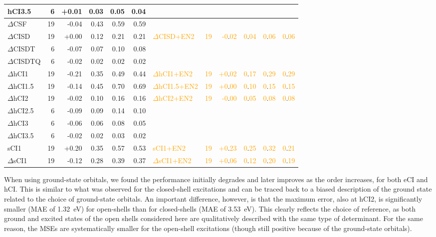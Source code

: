 \documentclass[aip,jcp,reprint,noshowkeys,superscriptaddress]{revtex4-1}
\newcommand{\fk}[1]{\textcolor{orange}{#1}}
\begin{document}
\begin{table}[ht!]
\begin{ruledtabular}
\begin{tabular}{ldddddlddddd}
hCI3.5            &  6 & +0.01 & 0.03 & 0.05 & 0.04  & & & & & & \\
%
\hline
$\Delta$CSF       & 19 & -0.04 & 0.43 & 0.59 & 0.59  & & & & & & \\
$\Delta$CISD      & 19 & +0.00 & 0.12 & 0.21 & 0.21  & \fk{$\Delta$CISD+EN2}   & \fk{19} & \fk{-0}.\fk{02} & \fk{0}.\fk{04} & \fk{0}.\fk{06} & \fk{0}.\fk{06} \\
$\Delta$CISDT     &  6 & -0.07 & 0.07 & 0.10 & 0.08  & & & & & & \\
$\Delta$CISDTQ    &  6 & -0.02 & 0.02 & 0.02 & 0.02  & & & & & & \\
%
\hline
$\Delta$hCI1      & 19 & -0.21 & 0.35 & 0.49 & 0.44  & \fk{$\Delta$hCI1+EN2}   & \fk{19} & \fk{+0}.\fk{02} & \fk{0}.\fk{17} & \fk{0}.\fk{29} & \fk{0}.\fk{29} \\
$\Delta$hCI1.5    & 19 & -0.14 & 0.45 & 0.70 & 0.69  & \fk{$\Delta$hCI1.5+EN2} & \fk{19} & \fk{+0}.\fk{00} & \fk{0}.\fk{10} & \fk{0}.\fk{15} & \fk{0}.\fk{15} \\
$\Delta$hCI2      & 19 & -0.02 & 0.10 & 0.16 & 0.16  & \fk{$\Delta$hCI2+EN2}   & \fk{19} & \fk{-0}.\fk{00} & \fk{0}.\fk{05} & \fk{0}.\fk{08} & \fk{0}.\fk{08} \\
$\Delta$hCI2.5    &  6 & -0.09 & 0.09 & 0.14 & 0.10  & & & & & & \\
$\Delta$hCI3      &  6 & -0.06 & 0.06 & 0.08 & 0.05  & & & & & & \\
$\Delta$hCI3.5    &  6 & -0.02 & 0.02 & 0.03 & 0.02  & & & & & & \\
%
\hline
sCI1              & 19 & +0.20 & 0.35 & 0.57 & 0.53  & \fk{sCI1+EN2}           & \fk{19} & \fk{+0}.\fk{23} & \fk{0}.\fk{25} & \fk{0}.\fk{32} & \fk{0}.\fk{21} \\
$\Delta$sCI1      & 19 & -0.12 & 0.28 & 0.39 & 0.37  & \fk{$\Delta$sCI1+EN2}   & \fk{19} & \fk{+0}.\fk{06} & \fk{0}.\fk{12} & \fk{0}.\fk{20} & \fk{0}.\fk{19} \\
\end{tabular}
\end{ruledtabular}
\end{table}

When using ground-state orbitals, we found the performance initially degrades and later improves as the order increases, for both eCI and hCI.
This is similar to what was observed for the closed-shell excitations
and can be traced back to a biased description of the ground state related to the choice of ground-state orbitals.
An important difference, however, is that the maximum error, also at hCI2, is significantly smaller (MAE of \SI{1.32}{\eV}) for open-shells
than for closed-shells (MAE of \SI{3.53}{\eV}).
This clearly reflects the choice of reference, as both ground and excited states of the open shells considered here are qualitatively described with the same type of determinant.
For the same reason, the MSEs are systematically smaller for the open-shell excitations (though still positive because of the ground-state orbitals).
\end{document}
